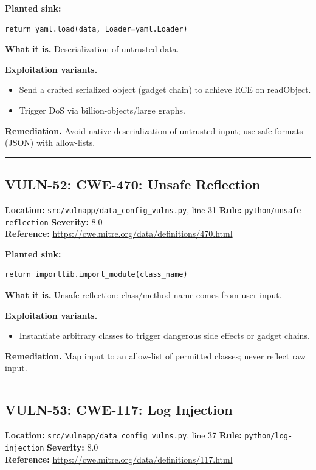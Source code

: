 \documentclass[11pt,a4paper]{article}
\begin{document}
\noindent\textbf{Planted sink:}
\begin{lstlisting}
return yaml.load(data, Loader=yaml.Loader)
\end{lstlisting}
\noindent\textbf{What it is.} Deserialization of untrusted data.

\noindent\textbf{Exploitation variants.}
\begin{itemize}[leftmargin=1.4em,itemsep=1pt,topsep=2pt]
\item Send a crafted serialized object (gadget chain) to achieve RCE on readObject.
\item Trigger DoS via billion-objects/large graphs.
\end{itemize}
\noindent\textbf{Remediation.} Avoid native deserialization of untrusted input; use safe formats (JSON) with allow-lists.

\vspace{4pt}\hrule\vspace{6pt}
\subsection{VULN-52: CWE-470: Unsafe Reflection}
\noindent\textbf{Location:} \texttt{src/vulnapp/data\_config\_vulns.py}, line 31 \quad \textbf{Rule:} \texttt{python/unsafe-reflection} \quad \textbf{Severity:} 8.0
\\ \textbf{Reference:} \url{https://cwe.mitre.org/data/definitions/470.html}

\noindent\textbf{Planted sink:}
\begin{lstlisting}
return importlib.import_module(class_name)
\end{lstlisting}
\noindent\textbf{What it is.} Unsafe reflection: class/method name comes from user input.

\noindent\textbf{Exploitation variants.}
\begin{itemize}[leftmargin=1.4em,itemsep=1pt,topsep=2pt]
\item Instantiate arbitrary classes to trigger dangerous side effects or gadget chains.
\end{itemize}
\noindent\textbf{Remediation.} Map input to an allow-list of permitted classes; never reflect raw input.

\vspace{4pt}\hrule\vspace{6pt}
\subsection{VULN-53: CWE-117: Log Injection}
\noindent\textbf{Location:} \texttt{src/vulnapp/data\_config\_vulns.py}, line 37 \quad \textbf{Rule:} \texttt{python/log-injection} \quad \textbf{Severity:} 8.0
\\ \textbf{Reference:} \url{https://cwe.mitre.org/data/definitions/117.html}
\end{document}
